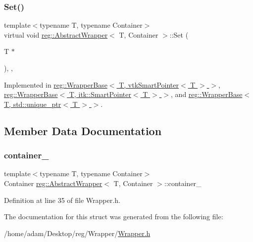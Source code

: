 \subsubsection{\texorpdfstring{Set()}{Set()}}
{\footnotesize\ttfamily template$<$typename T, typename Container$>$ \\
virtual void \hyperlink{structreg_1_1_abstract_wrapper}{reg\+::\+Abstract\+Wrapper}$<$ T, Container $>$\+::Set (\begin{DoxyParamCaption}\item[{T $\ast$}]{ }\end{DoxyParamCaption})\hspace{0.3cm}{\ttfamily [protected]}, {}, {\ttfamily [noexcept]}}



Implemented in \hyperlink{structreg_1_1_wrapper_base_3_01_t_00_01vtk_smart_pointer_3_01_t_01_4_01_4_aa066a74ca5abf0e13fd3ed62f0508e32}{reg\+::\+Wrapper\+Base$<$ T, vtk\+Smart\+Pointer$<$ T $>$ $>$}, \hyperlink{structreg_1_1_wrapper_base_3_01_t_00_01itk_1_1_smart_pointer_3_01_t_01_4_01_4_a9a9bcfbe7236f66cb355f929aeeca281}{reg\+::\+Wrapper\+Base$<$ T, itk\+::\+Smart\+Pointer$<$ T $>$ $>$}, and \hyperlink{structreg_1_1_wrapper_base_3_01_t_00_01std_1_1unique__ptr_3_01_t_01_4_01_4_a280dc1e6a85e2a95eaa849a45169942f}{reg\+::\+Wrapper\+Base$<$ T, std\+::unique\+\_\+ptr$<$ T $>$ $>$}.



\subsection{Member Data Documentation}
\mbox{\label{structreg_1_1_abstract_wrapper_a76a3713665e76d5ef8437681c7f309aa}} 
\subsubsection{\texorpdfstring{container\+\_\+}{container\_}}
{\footnotesize\ttfamily template$<$typename T, typename Container$>$ \\
Container \hyperlink{structreg_1_1_abstract_wrapper}{reg\+::\+Abstract\+Wrapper}$<$ T, Container $>$\+::container\+\_\+\hspace{0.3cm}{\ttfamily [protected]}}



Definition at line 35 of file Wrapper.\+h.



The documentation for this struct was generated from the following file\+:\begin{DoxyCompactItemize}
\item 
/home/adam/\+Desktop/reg/\+Wrapper/\hyperlink{_wrapper_8h}{Wrapper.\+h}\end{DoxyCompactItemize}
